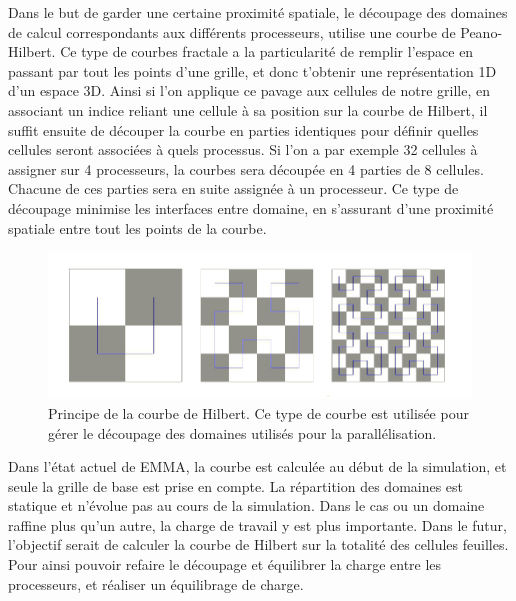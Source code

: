 Dans le but de garder une certaine proximité spatiale, le découpage des domaines de calcul correspondants aux différents processeurs, utilise une courbe de Peano-Hilbert.
Ce type de courbes fractale a la particularité de remplir l'espace en passant par tout les points d'une grille, et donc t'obtenir une représentation 1D d'un espace 3D.
Ainsi si l'on applique ce pavage aux cellules de notre grille, en associant un indice reliant une cellule à sa position sur la courbe de Hilbert, il suffit ensuite de découper la courbe en parties identiques pour définir quelles cellules seront associées à quels processus.
Si l'on a par exemple 32 cellules à assigner sur 4 processeurs, la courbes sera découpée en 4 parties de 8 cellules.
Chacune de ces parties sera en suite assignée à un processeur.
Ce type de découpage minimise les interfaces entre domaine, en s'assurant d'une proximité spatiale entre tout les points de la courbe.

\begin{figure}
        \includegraphics[width=.95\linewidth]{img/02/courbe_Hilbert.jpeg} 
        \caption[Courbe de Hilbert]{Principe de la courbe de Hilbert.
        Ce type de courbe est utilisée pour gérer le découpage des domaines utilisés pour la parallélisation.
 		\label{fig:hilbert}}
\end{figure}

%

Dans l'état actuel de EMMA, la courbe est calculée au début de la simulation, et seule la grille de base est prise en compte.
La répartition des domaines est statique et n'évolue pas au cours de la simulation.
Dans le cas ou un domaine raffine plus qu'un autre, la charge de travail y est plus importante.
Dans le futur, l'objectif serait de calculer la courbe de Hilbert sur la totalité des cellules feuilles.
Pour ainsi pouvoir refaire le découpage et équilibrer la charge entre les processeurs, et réaliser un équilibrage de charge.

